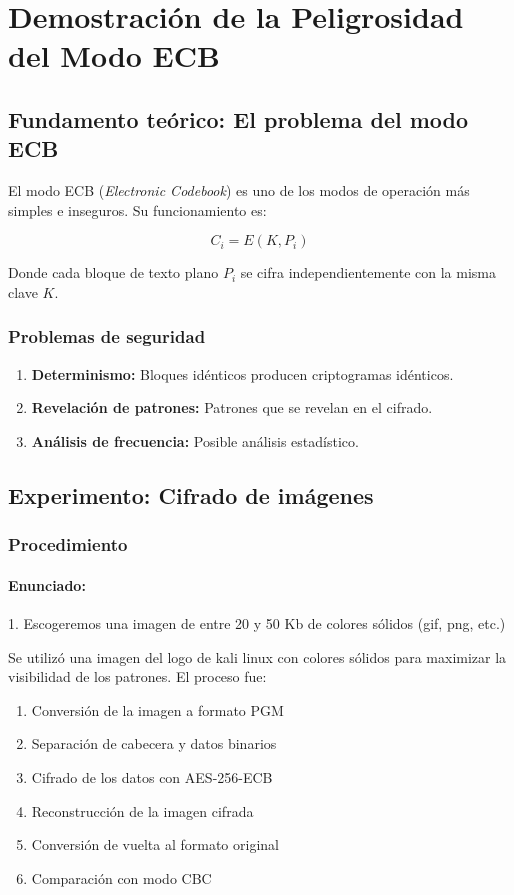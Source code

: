 
\chapter{Demostración de la Peligrosidad del Modo ECB}
\section{Fundamento teórico: El problema del modo ECB}

El modo ECB (\textit{Electronic Codebook}) es uno de los modos de operación más simples e inseguros. Su funcionamiento es:

\begin{equation}
C_i = E(K, P_i)
\end{equation}

Donde cada bloque de texto plano $P_i$ se cifra independientemente con la misma clave $K$.

\subsection{Problemas de seguridad}

\begin{enumerate}
    \item \textbf{Determinismo:} Bloques idénticos producen criptogramas idénticos.
    \item \textbf{Revelación de patrones:} Patrones que se revelan en el cifrado.
    \item \textbf{Análisis de frecuencia:} Posible análisis estadístico.
\end{enumerate}

\section{Experimento: Cifrado de imágenes}

\subsection{Procedimiento}
\subsubsection{Enunciado:}
1. Escogeremos una imagen de entre 20 y 50 Kb de colores sólidos (gif, png, etc.)

Se utilizó una imagen del logo de kali linux con colores sólidos para maximizar 
la visibilidad de los patrones. El proceso fue:

\begin{enumerate}
    \item Conversión de la imagen a formato PGM
    \item Separación de cabecera y datos binarios
    \item Cifrado de los datos con AES-256-ECB
    \item Reconstrucción de la imagen cifrada
    \item Conversión de vuelta al formato original
    \item Comparación con modo CBC
\end{enumerate}

